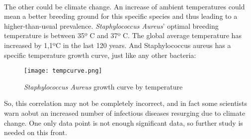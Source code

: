 \paragraph{}The other could be climate change. An increase of ambient temperatures could mean a better breeding ground for this specific species and thus leading to a higher-than-usual prevalence. \emph{Staphylococcus Aureus}' optimal breeding temperature is between 35º C and 37º C. The global average temperature has increased by 1,1ºC\cite{gmsGMSAnnualGlobal2016} in the last 120 years. And Staphylococcus aureus has a specific temperature growth curve, just like any other bacteria: \begin{center}\begin{figure}\texttt{[image: tempcurve.png]}\caption{\emph{Staphylococcus Aureus} growth curve by temperature\cite{FigEffectTemperature}}\end{figure}\end{center} So, this correlation may not be completely incorrect, and in fact some scientists warn aobut an increased number of infectious diseases resurging due to climate change. One only data point is not enough significant data, so further study is needed on this front.